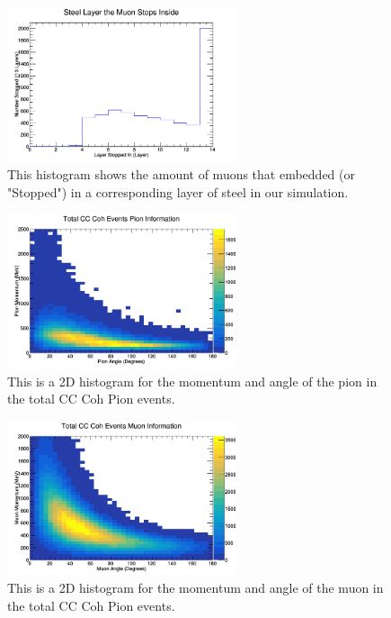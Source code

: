 \documentclass[11pt]{article}
\begin{document}
\begin{figure}[H]
\centering
\includegraphics[width=0.6\textwidth]{NewNMReinSehgalImages/7-LayerPenetrationNMRS.png}
\caption{This histogram shows the amount of muons that embedded (or "Stopped") in a corresponding layer of steel in our simulation.}
\end{figure}

\begin{figure}[H]
\centering
\includegraphics[width=0.6\textwidth]{NewNMReinSehgalImages/8-TotalCCCohPionInfoNMRS.png}
\caption{This is a 2D histogram for the momentum and angle of the pion in the total CC Coh Pion events.}
\end{figure}

\begin{figure}[H]
\centering
\includegraphics[width=0.6\textwidth]{NewNMReinSehgalImages/9-TotalCCCohMuonInfoNMRS.png}
\caption{This is a 2D histogram for the momentum and angle of the muon in the total CC Coh Pion events.}
\end{figure}
\end{document}

